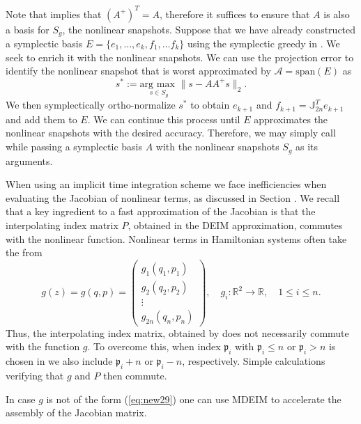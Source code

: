 Note that  implies that $(A^+)^T=A$, therefore it suffices to ensure that $A$ is also a basis for $S_g$, the nonlinear snapshots. Suppose that we have already constructed a symplectic basis $E =\{ e_1,\dots , e_k,f_1,\dots f_k \}$ using the symplectic greedy in . We seek to enrich it with the nonlinear snapshots. We can use the projection error to identify the nonlinear snapshot that is worst approximated by $\mathcal A = \text{span}(E)$ as
\begin{equation}
	s^* := \underset{s \in S_{ g}}{\text{arg\ max }}\| s - AA^+ s \|_2.	
\end{equation}
We then symplectically ortho-normalize $s^*$ to obtain $e_{k+1}$ and $f_{k+1} = \mathbb J_{2n}^T e_{k+1}$ and add them to $E$. We can continue this process until $E$ approximates the nonlinear snapshots with the desired accuracy. Therefore, we may simply call  while passing a symplectic basis $A$ with the nonlinear snapshots $S_g$ as its arguments.

When using an implicit time integration scheme we face inefficiencies when evaluating the Jacobian of nonlinear terms, as discussed in Section . We recall that a key ingredient to a fast approximation of the Jacobian is that the interpolating index matrix $P$, obtained in the DEIM approximation, commutes with the nonlinear function. Nonlinear terms in Hamiltonian systems often take the from
\begin{equation} \label{eq:new29}
	g (z) = g (q,p) = 
	\begin{pmatrix}
		g_1(q_1,p_1) \\
		g_2(q_2,p_2) \\
		\vdots \\
		g_{2n}(q_{n},p_{n})
	\end{pmatrix}, \quad g_{i}:\mathbb R^{2}\to \mathbb R, \quad 1\leq i \leq n.
\end{equation}
Thus, the interpolating index matrix, obtained by  does not necessarily commute with the function $g$. To overcome this, when index $\mathfrak p_i$ with $\mathfrak p_i\leq n$ or $\mathfrak p_i>n$ is chosen in  we also include $\mathfrak p_i + n$ or $\mathfrak p_i-n$, respectively. Simple calculations verifying that $g$ and $P$ then commute.

In case $g$ is not of the form (\ref{eq:new29}) one can use MDEIM \cite{carlberg2012efficient,negri2015efficient} to accelerate the assembly of the Jacobian matrix.





